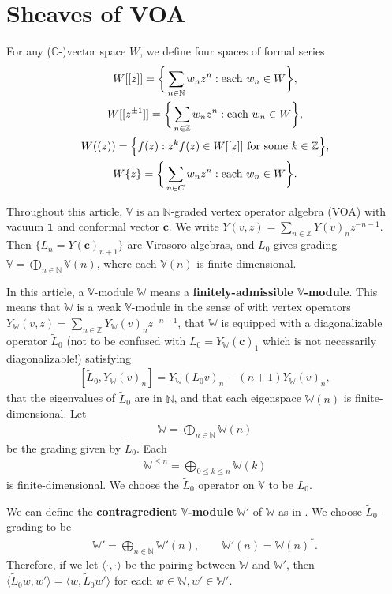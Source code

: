 \documentclass[12pt,a4paper,notitlepage]{article}
\theoremstyle{definition}
\theoremstyle{plain}
\newcommand{\wtd}{\widetilde}
\newcommand{\id}{\mathbf{1}}
\newcommand{\bk}[1]{\langle {#1}\rangle}
\newcommand{\mbb}{\mathbb}
\newcommand{\Vbb}{\mathbb V}
\newcommand{\Wbb}{\mathbb W}
\newcommand{\Cbb}{\mathbb C}
\newcommand{\Nbb}{\mathbb N}
\newcommand{\Zbb}{\mathbb Z}
\newcommand{\cbf}{\mathbf c}
\numberwithin{equation}{section}
\begin{document}
\section{Sheaves of VOA}\label{lb1}


For any ($\Cbb$-)vector space $W$, we define four spaces of formal series 
\begin{gather*}
W[[z]]=\bigg\{\sum_{n\in\mathbb N}w_nz^n:\text{each }w_n\in W\bigg\},\\
W[[z^{\pm 1}]]=\bigg\{\sum_{n\in\mathbb Z}w_nz^n:\text{each }w_n\in W\bigg\},\\
W((z))=\Big\{f(z):z^kf(z)\in W[[z]]\text{ for some }k\in\mbb Z \Big\},\\
W\{z\}=\bigg\{\sum_{n\in\mathbb \Cbb}w_nz^n:\text{each }w_n\in W\bigg\}.
\end{gather*}


Throughout this article, $\Vbb$ is an $\Nbb$-graded vertex operator algebra (VOA) with vacuum $\id$ and conformal vector $\cbf$. We write $Y(v,z)=\sum_{n\in\Zbb}Y(v)_nz^{-n-1}$. Then $\{L_n=Y(\cbf)_{n+1}\}$ are Virasoro algebras, and $L_0$ gives grading $\Vbb=\bigoplus_{n\in\Nbb}\Vbb(n)$, where each $\Vbb(n)$ is finite-dimensional. 

In this article,  a $\Vbb$-module $\Wbb$ means a \textbf{finitely-admissible $\Vbb$-module}. This means that $\Wbb$ is a weak $\Vbb$-module in the sense of \cite{DLM97} with vertex operators $Y_\Wbb(v,z)=\sum_{n\in\Zbb}Y_\Wbb(v)_nz^{-n-1}$, that $\Wbb$ is equipped with a diagonalizable operator $\wtd L_0$ (not to be confused with $L_0=Y_\Wbb(\cbf)_1$ which is not necessarily diagonalizable!) satisfying \index{L0@$\wtd L_0$}  
\begin{align}\label{eq34}
[\wtd L_0,Y_\Wbb(v)_n]=Y_\Wbb(L_0 v)_n-(n+1)Y_\Wbb(v)_n,	
\end{align}
that the eigenvalues of $\wtd L_0$ are in $\Nbb$, and that each eigenspace $\Wbb(n)$ is finite-dimensional. Let \index{W@$\Wbb(n),\Wbb_{(n)}$}
\begin{align*}
	\Wbb=\bigoplus_{n\in\Nbb}\Wbb(n)	
\end{align*}
be the grading given by $\wtd L_0$. Each
\begin{align*}
	\Wbb^{\leq n}=\bigoplus_{0\leq k\leq n}	\Wbb{(k)}
\end{align*}
is finite-dimensional. We choose  the $\wtd L_0$ operator on $\Vbb$ to be $L_0$.

We can define the \textbf{contragredient $\Vbb$-module} $\Wbb'$ of $\Wbb$ as in \cite{FHL93}. We choose $\wtd L_0$-grading to be
\begin{align*}
\Wbb'=	\bigoplus_{n\in\Nbb}\Wbb'{(n)},\qquad \Wbb'{(n)}=\Wbb{(n)}^*.
\end{align*}
Therefore, if we let $\bk{\cdot,\cdot}$ be the pairing between $\Wbb$ and $\Wbb'$, then $\bk{\wtd L_0 w,w'}=\bk{w,\wtd L_0 w'}$ for each $w\in\Wbb,w'\in\Wbb'$.
\end{document}
